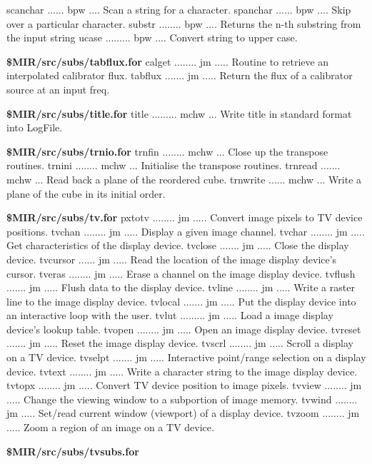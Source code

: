 {\eightpoint\begintt
scanchar ...... bpw .... Scan a string for a character.
spanchar ...... bpw .... Skip over a particular character.
substr ........ bpw .... Returns the n-th substring from the input string
ucase ......... bpw .... Convert string to upper case.
\endtt}
\par{\bf \$MIR/src/subs/tabflux.for}
{\eightpoint\begintt
calget ........ jm ..... Routine to retrieve an interpolated calibrator flux.
tabflux ....... jm ..... Return the flux of a calibrator source at an input freq.
\endtt}
\par{\bf \$MIR/src/subs/title.for}
{\eightpoint\begintt
title ......... mchw ... Write title in standard format into LogFile.
\endtt}
\par{\bf \$MIR/src/subs/trnio.for}
{\eightpoint\begintt
trnfin ........ mchw ... Close up the transpose routines.
trnini ........ mchw ... Initialise the transpose routines.
trnread ....... mchw ... Read back a plane of the reordered cube.
trnwrite ...... mchw ... Write a plane of the cube in its initial order.
\endtt}
\par{\bf \$MIR/src/subs/tv.for}
{\eightpoint\begintt
pxtotv ........ jm ..... Convert image pixels to TV device positions.
tvchan ........ jm ..... Display a given image channel.
tvchar ........ jm ..... Get characteristics of the display device.
tvclose ....... jm ..... Close the display device.
tvcursor ...... jm ..... Read the location of the image display device's cursor.
\endtt}
{\eightpoint\begintt
tveras ........ jm ..... Erase a channel on the image display device.
tvflush ....... jm ..... Flush data to the display device.
tvline ........ jm ..... Write a raster line to the image display device.
tvlocal ....... jm ..... Put the display device into an interactive loop with the user.
tvlut ......... jm ..... Load a image display device's lookup table.
\endtt}
{\eightpoint\begintt
tvopen ........ jm ..... Open an image display device.
tvreset ....... jm ..... Reset the image display device.
tvscrl ........ jm ..... Scroll a display on a TV device.
tvselpt ....... jm ..... Interactive point/range selection on a display device.
tvtext ........ jm ..... Write a character string to the image display device.
\endtt}
{\eightpoint\begintt
tvtopx ........ jm ..... Convert TV device position to image pixels.
tvview ........ jm ..... Change the viewing window to a subportion of image memory.
tvwind ........ jm ..... Set/read current window (viewport) of a display device.
tvzoom ........ jm ..... Zoom a region of an image on a TV device.
\endtt}
\par{\bf \$MIR/src/subs/tvsubs.for}
